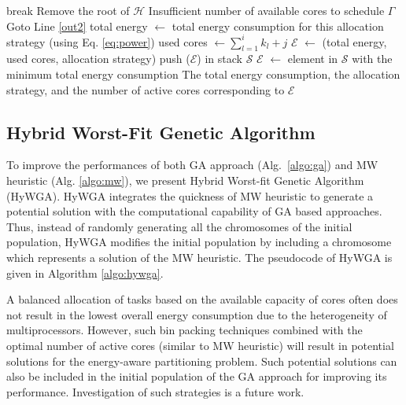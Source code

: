 \documentclass[conference]{IEEEtran}
\begin{document}
\begin{algorithm}
\begin{algorithmic}[1]
					\STATE break
					\ELSE
					\STATE Remove the root of  $\mathcal{H}$
					\ENDIF
				\ENDWHILE  \label{end-inner}
				 \label{stop}
					\STATE Insufficient number of available cores to schedule $\Gamma$
					\STATE Goto Line \ref{out2}
				\ENDIF
			\ENDIF
		\ENDFOR \label{worst-end}
		\STATE total energy $\leftarrow$ total energy consumption for this allocation strategy (using Eq. \ref{eq:power}) \label{tpower}
		\STATE \label{core} used cores $\leftarrow \sum_{l=1}^{i}k_l + j$
		\STATE  \label{triplet} $\mathcal{E}$ $\leftarrow$  (total energy, used cores, allocation strategy)
		\STATE \label{stack} push ($\mathcal{E}$) in stack $\mathcal{S}$
	\ENDFOR
\ENDFOR
\STATE \label{out2}  $\mathcal{E}$ $\leftarrow$ element in   $\mathcal{S}$ with the minimum total energy consumption
\PRINT  The total energy consumption, the allocation  strategy, and the number of active cores corresponding to  $\mathcal{E}$  \label{out1}
\end{algorithmic}
\end{algorithm}


\subsection{Hybrid Worst-Fit Genetic Algorithm} %

To improve the performances of both GA approach (Alg.~\ref{algo:ga}) and MW heuristic (Alg. \ref{algo:mw}),
we present Hybrid Worst-fit Genetic Algorithm (HyWGA).
HyWGA integrates the quickness of MW heuristic to generate a potential solution with the computational capability
of GA based approaches. %
Thus, instead of randomly generating all the chromosomes of the initial
population, HyWGA modifies the initial population by including a chromosome which represents a solution of the MW heuristic.
The pseudocode of HyWGA is given in Algorithm \ref{algo:hywga}.

A balanced allocation of tasks based on the available capacity of cores often does not result in the lowest overall energy consumption due to the heterogeneity of multiprocessors. However, such bin packing techniques combined with the optimal number of active cores (similar to MW heuristic)
will result in  potential solutions for the energy-aware partitioning problem. Such potential solutions can also be included in the initial population
of the GA approach for improving its performance.
Investigation of such strategies %
is a future work.
\end{document}
